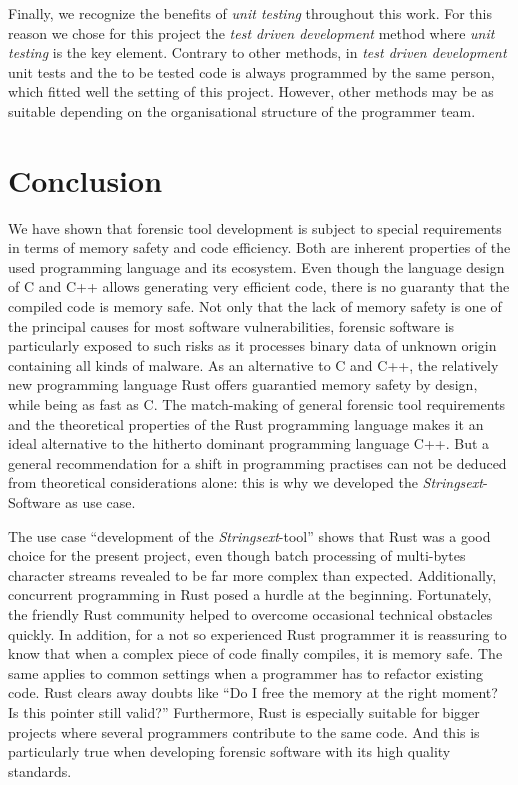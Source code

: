 \documentclass[final,5p,times,twocolumn]{elsarticle}
\begin{document}
Finally, we recognize the benefits of \emph{unit testing} throughout this work.
For this reason we chose for this project the \emph{test driven development}
method where \emph{unit testing} is the key element. Contrary to other methods,
in \emph{test driven development} unit tests and the to be tested code is always
programmed by the same person, which fitted well the setting of this project.
However, other methods may be as suitable depending on the organisational
structure of the programmer team.

\section{Conclusion}

We have shown that forensic tool development is subject to special requirements
in terms of memory safety and code efficiency. Both are inherent properties of
the used programming language and its ecosystem. Even though the language design
of C and C++ allows generating very efficient code, there is no guaranty that
the compiled code is memory safe. Not only that the lack of memory safety is one
of the principal causes for most software vulnerabilities, forensic software is
particularly exposed to such risks as it processes binary data of unknown origin
containing all kinds of malware.  As an alternative to C and C++, the relatively
new programming language Rust offers guarantied memory safety by design, while
being as fast as C. The match-making of general forensic tool requirements and
the theoretical properties of the Rust programming language makes it an ideal
alternative to the hitherto dominant programming language C++.  But a general
recommendation for a shift in programming practises can not be deduced from
theoretical considerations alone: this is why we developed the
\emph{Stringsext}-Software as use case. 

The use case ``development of the \emph{Stringsext}-tool'' shows that Rust was a
good choice for the present project, even though batch processing of multi-bytes
character streams revealed to be far more complex than expected.  Additionally,
concurrent programming in Rust posed a hurdle at the beginning.  Fortunately,
the friendly Rust community helped to overcome occasional technical obstacles
quickly. In addition, for a not so experienced Rust programmer it is reassuring
to know that when a complex piece of code finally compiles, it is memory safe.
The same applies to common settings when a programmer has to refactor existing
code. Rust clears away doubts like ``Do I free the memory at the right moment?
Is this pointer still valid?'' Furthermore, Rust is especially suitable
for bigger projects where several programmers contribute to the same code. And
this is particularly true when developing forensic software with its high
quality standards.
\end{document}
